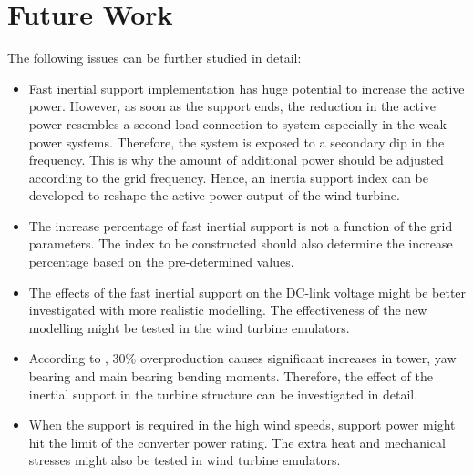 \section{Future Work}
The following issues can be further studied in detail:
\begin{itemize}
	\item Fast inertial support implementation has huge potential to increase the active power. However, as soon as the support ends, the reduction in the active power resembles a second load connection to system especially in the weak power systems. Therefore, the system is exposed to a secondary dip in the frequency. This is why the amount of additional power should be adjusted according to the grid frequency. Hence, an inertia support index can be developed to reshape the active power output of the wind turbine. 
	\item The increase percentage of fast inertial support is not a function of the grid parameters. The index to be constructed should also determine the increase percentage based on the pre-determined values. 
	\item The effects of the fast inertial support on the DC-link voltage might be better investigated with more realistic modelling. The effectiveness of the new modelling might be tested in the wind turbine emulators. 
	\item According to \cite{Altin2018}, 30\% overproduction causes significant increases in  tower, yaw bearing and main bearing bending moments. Therefore, the effect of the inertial support in the turbine structure can be investigated in detail. 
	\item When the support is required in the high wind speeds, support power might hit the limit of the converter power rating. The extra heat and mechanical stresses might also be tested in wind turbine emulators. 
\end{itemize}